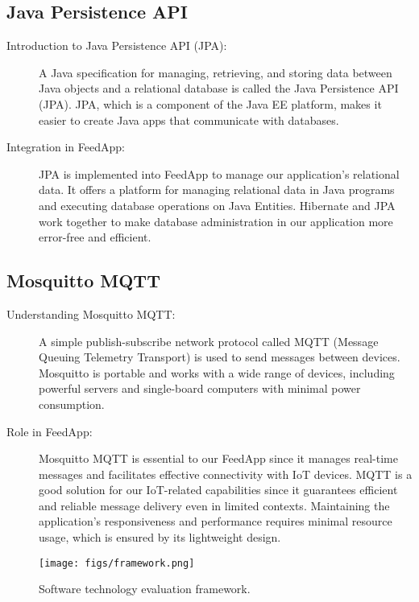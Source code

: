 \subsection{Java Persistence API}
\begin{description}
 \item[Introduction to Java Persistence API (JPA):]
A Java specification for managing, retrieving, and storing data between Java objects and a relational database is called the Java Persistence API (JPA). JPA, which is a component of the Java EE platform, makes it easier to create Java apps that communicate with databases.

 \item[Integration in FeedApp:]
JPA is implemented into FeedApp to manage our application's relational data. It offers a platform for managing relational data in Java programs and executing database operations on Java Entities. Hibernate and JPA work together to make database administration in our application more error-free and efficient.
\end{description}

\subsection{Mosquitto MQTT}
\begin{description}
 \item[Understanding Mosquitto MQTT:]
A simple publish-subscribe network protocol called MQTT (Message Queuing Telemetry Transport) is used to send messages between devices. Mosquitto is portable and works with a wide range of devices, including powerful servers and single-board computers with minimal power consumption.

 \item[Role in FeedApp:]
Mosquitto MQTT is essential to our FeedApp since it manages real-time messages and facilitates effective connectivity with IoT devices. MQTT is a good solution for our IoT-related capabilities since it guarantees efficient and reliable message delivery even in limited contexts. Maintaining the application's responsiveness and performance requires minimal resource usage, which is ensured by its lightweight design.
\end{description}

\begin{figure}
  \centering
  \texttt{[image: figs/framework.png]}
  \caption{Software technology evaluation framework.}
  \label{fig:framework}
\end{figure}
